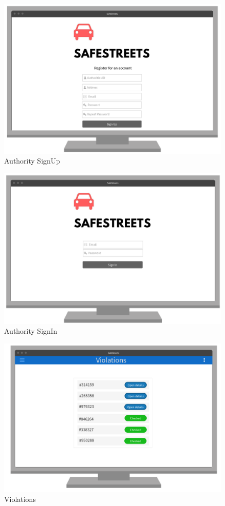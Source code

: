 \documentclass{article}
\begin{document}
\begin{figure}[H]
    \centering
    \includegraphics[scale=0.35]{Images/WEBSignUp}
    \caption{Authority SignUp}
\end{figure}
\begin{figure}[H]
    \centering
    \includegraphics[scale=0.35]{Images/WEBSignIn}
    \caption{Authority SignIn}
\end{figure}
\begin{figure}[H]
    \centering
    \includegraphics[scale=0.35]{Images/WEBViolations}
    \caption{Violations}
\end{figure}
\end{document}
